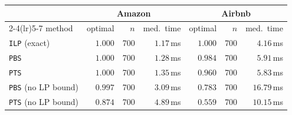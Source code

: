 \begin{tabular}{lrrrrrr}
\toprule
& \multicolumn{3}{c}{Amazon} & \multicolumn{3}{c}{Airbnb} \\
\cmidrule(lr){2-4}\cmidrule(lr){5-7}
method & optimal & $n$ & med.\ time & optimal & $n$ & med.\ time \\
\midrule
\texttt{ILP} (exact) & $1.000$ & 700 & $1.17$\,ms & $1.000$ & 700 & $4.16$\,ms \\
\texttt{PBS} & $1.000$ & 700 & $1.28$\,ms & $0.984$ & 700 & $5.91$\,ms \\
\texttt{PTS} & $1.000$ & 700 & $1.35$\,ms & $0.960$ & 700 & $5.83$\,ms \\
\texttt{PBS} (no LP bound) & $0.997$ & 700 & $3.09$\,ms & $0.783$ & 700 & $16.79$\,ms \\
\texttt{PTS} (no LP bound) & $0.874$ & 700 & $4.89$\,ms & $0.559$ & 700 & $10.15$\,ms \\
\bottomrule
\end{tabular}
